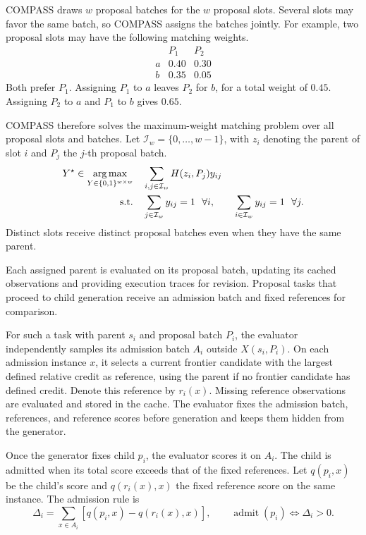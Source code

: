 COMPASS draws $w$ proposal batches for the $w$ proposal slots.  Several slots
may favor the same batch, so COMPASS assigns the batches jointly.  For example,
two proposal slots may have the following matching weights.
\[
\begin{array}{c|cc}
 & P_1 & P_2\\ \hline
a & 0.40 & 0.30\\
b & 0.35 & 0.05
\end{array}
\]
Both prefer $P_1$.  Assigning $P_1$ to $a$ leaves $P_2$ for $b$, for a total
weight of $0.45$.  Assigning $P_2$ to $a$ and $P_1$ to $b$ gives $0.65$.

COMPASS therefore solves the maximum-weight matching problem over all proposal
slots and batches.  Let $\mathcal I_w=\{0,\ldots,w-1\}$, with $z_i$ denoting
the parent of slot $i$ and $P_j$ the $j$-th proposal batch.
\begin{equation}
\begin{aligned}
Y^\star\in\operatorname*{arg\,max}_{Y\in\{0,1\}^{w\times w}}\quad
&\sum_{i,j\in\mathcal I_w}H(z_i,P_j)y_{ij}\\
\text{s.t.}\quad
&\sum_{j\in\mathcal I_w}y_{ij}=1\ \ \forall i,
\qquad
\sum_{i\in\mathcal I_w}y_{ij}=1\ \ \forall j.
\end{aligned}
\label{eq:proposal_assignment}
\end{equation}
Distinct slots receive distinct proposal batches even when they have the same
parent.

Each assigned parent is evaluated on its proposal batch, updating its cached
observations and providing execution traces for revision.  Proposal tasks that
proceed to child generation receive an admission batch and fixed references for
comparison.

For such a task with parent $s_i$ and proposal batch $P_i$, the evaluator
independently samples its admission batch $A_i$ outside $X(s_i,P_i)$.
On each admission instance $x$, it selects a current frontier candidate with
the largest defined relative credit as reference, using the parent if no frontier candidate has defined
credit.  Denote this reference by $r_i(x)$.  Missing reference observations are
evaluated and stored in the cache.  The evaluator fixes the admission batch,
references, and reference scores before generation and keeps them hidden from
the generator.

Once the generator fixes child $p_i$, the evaluator scores it on $A_i$.  The
child is admitted when its total score exceeds that of the fixed references.  Let
$q(p_i,x)$ be the child's score and $q(r_i(x),x)$ the fixed reference score on
the same instance.  The admission rule is
\begin{equation}
\Delta_i=\sum_{x\in A_i}\left[q(p_i,x)-q(r_i(x),x)\right],
\qquad
\operatorname{admit}(p_i)\iff\Delta_i>0.
\label{eq:admission_gate}
\end{equation}

